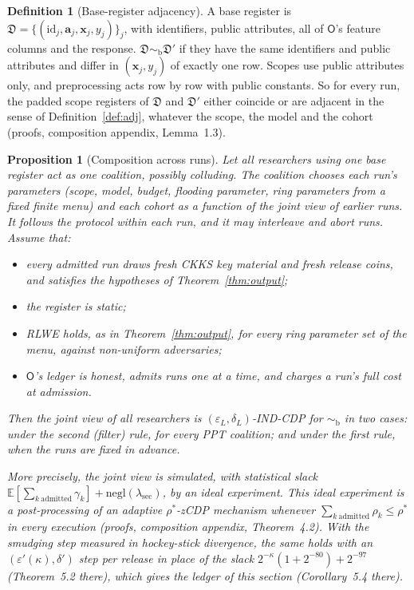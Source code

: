 \documentclass[11pt]{article}
\theoremstyle{definition}
\newtheorem{definition}{Definition}[section]
\theoremstyle{plain}
\newtheorem{proposition}{Proposition}[section]
\newcommand{\E}{\mathbb{E}}
\newcommand{\bx}{\mathbf{x}}
\newcommand{\Party}[1]{\textsf{#1}}
\newcommand{\Op}{\Party{O}}
\begin{document}
\begin{definition}[Base-register adjacency]
\label{def:baseadj}
A base register is $\mathfrak D = \{(\mathrm{id}_j, \mathbf a_j, \bx_j, y_j)\}_j$, with identifiers, public attributes, all of $\Op$'s feature columns and the response. $\mathfrak D \sim_{\mathrm b} \mathfrak D'$ if they have the same identifiers and public attributes and differ in $(\bx_j, y_j)$ of exactly one row. Scopes use public attributes only, and preprocessing acts row by row with public constants. So for every run, the padded scope registers of $\mathfrak D$ and $\mathfrak D'$ either coincide or are adjacent in the sense of Definition~\ref{def:adj}, whatever the scope, the model and the cohort (proofs, composition appendix, Lemma~1.3).
\end{definition}

\begin{proposition}[Composition across runs]
\label{prop:compose}
Let all researchers using one base register act as one coalition, possibly colluding. The coalition chooses each run's parameters (scope, model, budget, flooding parameter, ring parameters from a fixed finite menu) and each cohort as a function of the joint view of earlier runs. It follows the protocol within each run, and it may interleave and abort runs. Assume that:
\begin{itemize}[noitemsep]
  \item every admitted run draws fresh CKKS key material and fresh release coins, and satisfies the hypotheses of Theorem~\ref{thm:output};
  \item the register is static;
  \item RLWE holds, as in Theorem~\ref{thm:output}, for every ring parameter set of the menu, against non-uniform adversaries;
  \item $\Op$'s ledger is honest, admits runs one at a time, and charges a run's full cost at admission.
\end{itemize}
Then the joint view of all researchers is $(\varepsilon_L, \delta_L)$-IND-CDP for $\sim_{\mathrm b}$ in two cases: under the second (filter) rule, for every PPT coalition; and under the first rule, when the runs are fixed in advance.

More precisely, the joint view is simulated, with statistical slack $\E[\sum_{k\ \mathrm{admitted}}\gamma_k] + \mathrm{negl}(\lambda_{\mathrm{sec}})$, by an ideal experiment. This ideal experiment is a post-processing of an adaptive $\rho^*$-zCDP mechanism whenever $\sum_{k\ \mathrm{admitted}}\rho_k \le \rho^*$ in every execution (proofs, composition appendix, Theorem~4.2). With the smudging step measured in hockey-stick divergence, the same holds with an $(\varepsilon'(\kappa), \delta')$ step per release in place of the slack $2^{-\kappa}(1 + 2^{-80}) + 2^{-97}$ (Theorem~5.2 there), which gives the ledger of this section (Corollary~5.4 there).
\end{proposition}
\end{document}
